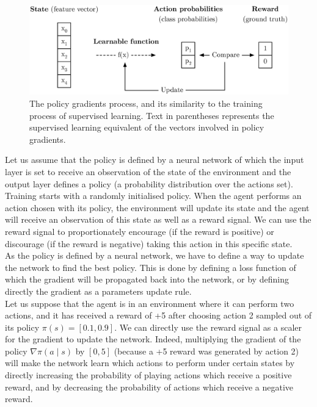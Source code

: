 \begin{figure}
	\centering
	\includegraphics[width=0.8\linewidth]{fig/supervised_vs_pg.eps}
	\caption{The policy gradients process, and its similarity to
	the training process of supervised learning. Text in parentheses
	represents the supervised learning equivalent of the vectors 
	involved in policy gradients.}
	\label{fig:supervised_vs_pg}
\end{figure}

Let us assume that the
policy is defined by a neural network of which the input layer is set to 
receive an observation of the state of the environment and the output layer
defines a policy (a probability distribution over the actions set).
Training starts with a randomly initialised policy. 
When the agent performs an action chosen with its policy, the environment will
update its state and the agent will receive an observation of this state as
well as a reward signal. We can use the reward signal to proportionately
encourage (if the reward is 
positive) or discourage (if the reward is negative) taking this action in 
this specific state.\\

As the policy is defined by a neural network, we have to define a way to
update the network to find the best policy. This is done by defining a loss
function of which the gradient will be propagated back into the network, or
by defining directly the gradient as a parameters update rule.\\

Let us suppose that the agent is in an environment where it can perform two
actions, and it has received a reward of +5 after choosing action 2
sampled out of its policy $\pi(s) = [0.1, 0.9]$. We can directly use the
reward signal as a scaler for the gradient to update the network. Indeed,
multiplying the gradient of the policy $\nabla \pi(a \mid s)$ by 
$[0, 5]$ (because a +5 reward was generated by action 2) will make the network
learn which actions to perform under certain states by directly increasing the
probability of playing actions which receive a positive reward, and by
decreasing the probability of actions which receive a negative reward.\\

